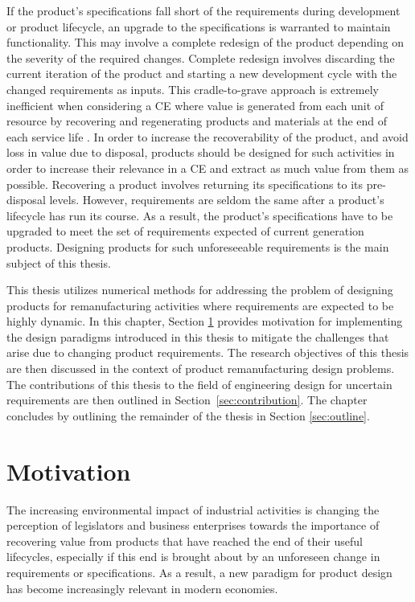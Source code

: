 If the product's specifications fall short of the requirements during development or product lifecycle, an upgrade to the specifications is warranted to maintain functionality. This may involve a complete redesign of the product depending on the severity of the required changes. Complete redesign involves discarding the current iteration of the product and starting a new development cycle with the changed requirements as inputs. This cradle-to-grave approach is extremely inefficient when considering a \ac{CE} where value is generated from each unit of resource by recovering and regenerating products and materials at the end of each service life \cite{MacArthur2013b}. In order to increase the recoverability of the product, and avoid loss in value due to disposal, products should be designed for such activities in order to increase their relevance in a \ac{CE} and extract as much value from them as possible. Recovering a product involves returning its specifications to its pre-disposal levels. However, requirements are seldom the same after a product's lifecycle has run its course. As a result, the product's specifications have to be upgraded to meet the set of requirements expected of current generation products. Designing products for such unforeseeable requirements is the main subject of this thesis.

This thesis utilizes numerical methods for addressing the problem of designing prod\-ucts for remanufacturing activities where requirements are expected to be highly dynamic. In this chapter, Section \ref{sec:motivation} provides motivation for implementing the design para\-digms introduced in this thesis to mitigate the challenges that arise due to changing product requirements. The research objectives of this thesis are then discussed in the context of product remanufacturing design problems. The contributions of this thesis to the field of engineering design for uncertain requirements are then outlined in Section~\ref{sec:contribution}. The chapter concludes by outlining the remainder of the thesis in Section \ref{sec:outline}.

\section{Motivation}
\label{sec:motivation}

The increasing environmental impact of industrial activities is changing the perception of legislators and business enterprises towards the importance of recovering value from products that have reached the end of their useful lifecycles, especially if this end is brought about by an unforeseen change in requirements or specifications. As a result, a new paradigm for product design has become increasingly relevant in modern economies.

